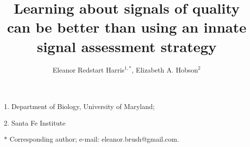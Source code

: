 




\noindent
\title{Learning about signals of quality can be better than using an innate signal assessment strategy} 
\author{Eleanor Redstart Harris$^{1, \ast}$, Elizabeth A. Hobson$^2$}
\date{} 
\maketitle

\noindent{} 1. Department of Biology, University of Maryland;

\noindent{} 2. Santa Fe Institute

\noindent{} $\ast$ Corresponding author; e-mail: eleanor.brush@gmail.com.



\linenumbers





